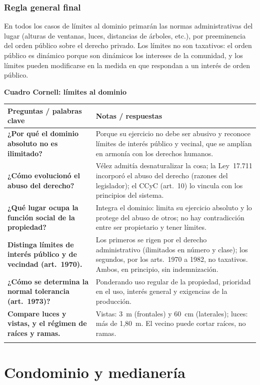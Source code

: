 \documentclass[12pt,oneside]{book}
\renewcommand{\arraystretch}{1.25}
\newcommand{\cq}[2]{\textbf{#1} & #2 \\[0.45em]}
\newcommand{\cornell}[3]{%
\par\bigskip\noindent\textbf{\large Cuadro Cornell: #1}\par\smallskip
\begin{center}
\small
\renewcommand{\arraystretch}{1.15}
\begin{tabularx}{\textwidth}{>{\raggedright\arraybackslash}p{0.27\textwidth}>{\raggedright\arraybackslash}X}
\toprule
\textbf{Preguntas / palabras clave} & \textbf{Notas / respuestas} \\
\midrule
#2
\midrule
\multicolumn{2}{p{\dimexpr\textwidth-2\tabcolsep\relax}}{\textbf{Resumen.} #3} \\
\bottomrule
\end{tabularx}
\end{center}
}
\begin{document}
\section{Regla general final}

\begin{importante}
En todos los casos de límites al dominio primarán las normas administrativas del lugar (alturas de ventanas, luces, distancias de árboles, etc.), por preeminencia del orden público sobre el derecho privado. Los límites no son taxativos: el orden público es dinámico porque son dinámicos los intereses de la comunidad, y los límites pueden modificarse en la medida en que respondan a un interés de orden público.
\end{importante}

\cornell{límites al dominio}{
\cq{¿Por qué el dominio absoluto no es ilimitado?}{Porque su ejercicio no debe ser abusivo y reconoce límites de interés público y vecinal, que se amplían en armonía con los derechos humanos.}
\cq{¿Cómo evolucionó el abuso del derecho?}{Vélez admitía desnaturalizar la cosa; la Ley~17.711 incorporó el abuso del derecho (razones del legislador); el CCyC (art.~10) lo vincula con los principios del sistema.}
\cq{¿Qué lugar ocupa la función social de la propiedad?}{Integra el dominio: limita su ejercicio absoluto y lo protege del abuso de otros; no hay contradicción entre ser propietario y tener límites.}
\cq{Distinga límites de interés público y de vecindad (art.~1970).}{Los primeros se rigen por el derecho administrativo (ilimitados en número y clase); los segundos, por los arts.~1970 a 1982, no taxativos. Ambos, en principio, sin indemnización.}
\cq{¿Cómo se determina la normal tolerancia (art.~1973)?}{Ponderando uso regular de la propiedad, prioridad en el uso, interés general y exigencias de la producción.}
\cq{Compare luces y vistas, y el régimen de raíces y ramas.}{Vistas: 3~m (frontales) y 60~cm (laterales); luces: más de 1,80~m. El vecino puede cortar raíces, no ramas.}
}{El dominio absoluto está sometido a límites de interés público (derecho administrativo) y vecinal (arts.~1970 a 1982), fundados en la función social de la propiedad y en el abuso del derecho. Las normas administrativas primarán siempre y los límites no son taxativos.}

\part{Condominio y medianería}
\end{document}
